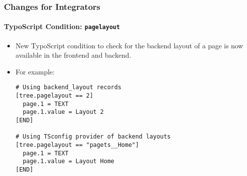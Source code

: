 %

\begin{frame}[fragile]
	\frametitle{Changes for Integrators}
	\framesubtitle{TypoScript Condition: \texttt{pagelayout}}

	\lstset{basicstyle=\tiny\ttfamily}

	\begin{itemize}
		\item New TypoScript condition to check for the backend layout of a page
			is now available in the frontend and backend.
		\item For example:
\begin{lstlisting}
# Using backend_layout records
[tree.pagelayout == 2]
  page.1 = TEXT
  page.1.value = Layout 2
[END]

# Using TSconfig provider of backend layouts
[tree.pagelayout == "pagets__Home"]
  page.1 = TEXT
  page.1.value = Layout Home
[END]
\end{lstlisting}

	\end{itemize}
\end{frame}

